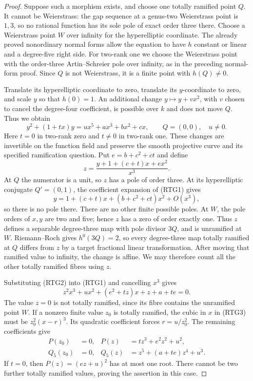 \begin{proof}
Suppose such a morphism exists, and choose one totally ramified point
$Q$. It cannot be Weierstrass: the gap sequence at a genus-two
Weierstrass point is $1,3$, so no rational function has its sole pole
of exact order three there. Choose a Weierstrass point $W$ over
infinity for the hyperelliptic coordinate. The already proved
nonordinary normal forms allow the equation to have $h$ constant
or linear and a degree-five right side. For two-rank one we choose
the Weierstrass point with the order-three Artin--Schreier pole over
infinity, as in the preceding normal-form proof. Since $Q$ is not
Weierstrass, it is a finite point with $h(Q)\ne0$.

Translate its hyperelliptic coordinate to zero, translate its
$y$-coordinate to zero, and scale $y$ so that $h(0)=1$.
An additional change $y\mapsto y+v x^2$, with $v$ chosen to cancel
the degree-four coefficient, is possible over $k$ and does not move
$Q$. Thus we obtain
\[
 y^2+(1+t x)y=u x^5+a x^3+b x^2+c x,
 \qquad Q=(0,0),\quad u\ne0.                         \tag{RTG1}
\]
Here $t=0$ in two-rank zero and $t\ne0$ in two-rank one. These
changes are invertible on the function field and preserve the
smooth projective curve and its specified ramification question.
Put $e=b+c^2+ct$ and define
\[
                 z=\frac{y+1+(c+t)x+e x^2}{x^3}.       \tag{RTG2}
\]
At $Q$ the numerator is a unit, so $z$ has a pole of order three.
At its hyperelliptic conjugate $Q'=(0,1)$, the coefficient expansion
of (RTG1) gives
\[
        y=1+(c+t)x+(b+c^2+ct)x^2+O(x^3),
\]
so there is no pole there. There are no other finite possible poles.
At $W$, the pole orders of $x,y$ are two and five; hence $z$ has
a zero of order exactly one. Thus $z$ defines a separable degree-three
map with pole divisor $3Q$, and is unramified at $W$.
Riemann--Roch gives $h^0(3Q)=2$, so every degree-three map totally
ramified at $Q$ differs from $z$ by a target fractional linear
transformation. After moving that ramified value to infinity, the
change is affine. We may therefore count all the other totally
ramified fibres using $z$.

Substituting (RTG2) into (RTG1) and cancelling $x^3$ gives
\[
 z^2x^3+u x^2+(e^2+t z)x+z+a+te=0.                    \tag{RTG3}
\]
The value $z=0$ is not totally ramified, since its fibre contains
the unramified point $W$. If a nonzero finite value $z_0$ is totally
ramified, the cubic in $x$ in (RTG3) must be
$z_0^2(x-r)^3$. Its quadratic coefficient forces $r=u/z_0^2$.
The remaining coefficients give
\[
 \begin{split}
 P(z_0)&=0,&P(z)&=t z^3+e^2z^2+u^2,\\
 Q_5(z_0)&=0,&Q_5(z)&=z^5+(a+te)z^4+u^3.
 \end{split}                                         \tag{RTG4}
\]
If $t=0$, then $P(z)=(ez+u)^2$ has at most one root. There
cannot be two further totally ramified values, proving the assertion
in this case.


\end{proof}
